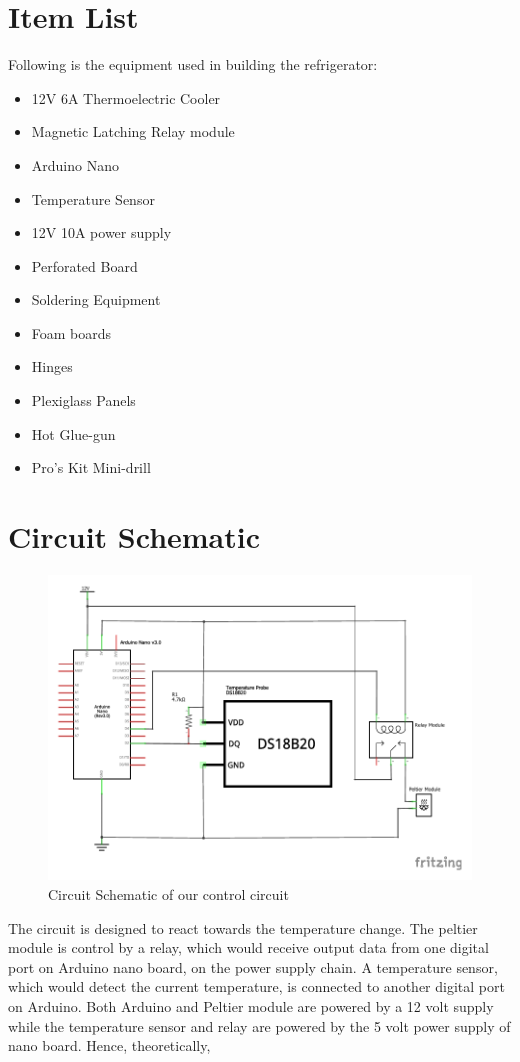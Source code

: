 \documentclass[12pt,a4paper]{report}
\begin{document}
\section{Item List}
Following is the equipment used in building the refrigerator:
\begin{itemize}\itemsep -2pt
\item 12V 6A Thermoelectric Cooler
\item Magnetic Latching Relay module
\item Arduino Nano
\item Temperature Sensor
\item 12V 10A power supply
\item Perforated Board
\item Soldering Equipment
\item Foam boards
\item Hinges
\item Plexiglass Panels
\item Hot Glue-gun
\item Pro's Kit Mini-drill
\end{itemize}

\section{Circuit Schematic}
\begin{figure}[!h]
	\centering
	\includegraphics[scale=1.0]{mini_fridge_schem}
	\caption{Circuit Schematic of our control circuit}
\end{figure}
The circuit is designed to react towards the temperature change. The peltier module is control by a relay, which would receive output data from one digital port on Arduino nano board, on the power supply chain. A temperature sensor, which would detect the current temperature, is connected to another digital port on Arduino. Both Arduino and Peltier module are powered by a 12 volt supply while the temperature sensor and relay are powered by the 5 volt power supply of nano board.
Hence, theoretically,
\end{document}
